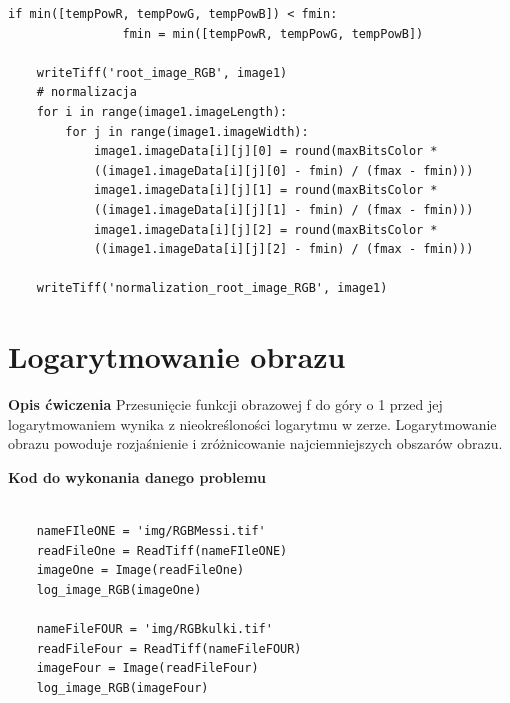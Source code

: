 \documentclass[magisterska,openany]{pracadypl}
\begin{document}
\begin{lstlisting}[caption={Pierwiastkowanie obrazu}]
            if min([tempPowR, tempPowG, tempPowB]) < fmin:
                fmin = min([tempPowR, tempPowG, tempPowB])

    writeTiff('root_image_RGB', image1)
    # normalizacja
    for i in range(image1.imageLength):
        for j in range(image1.imageWidth):
            image1.imageData[i][j][0] = round(maxBitsColor * 
            ((image1.imageData[i][j][0] - fmin) / (fmax - fmin)))
            image1.imageData[i][j][1] = round(maxBitsColor * 
            ((image1.imageData[i][j][1] - fmin) / (fmax - fmin)))
            image1.imageData[i][j][2] = round(maxBitsColor * 
            ((image1.imageData[i][j][2] - fmin) / (fmax - fmin)))

    writeTiff('normalization_root_image_RGB', image1)

\end{lstlisting}
\newpage


\section{Logarytmowanie obrazu}

\vspace{0.5cm}\textbf{\Large Opis ćwiczenia}
\vspace{0.25cm}\newline
Przesunięcie funkcji obrazowej f do góry o 1 przed jej logarytmowaniem wynika z
nieokreśloności logarytmu w zerze. Logarytmowanie obrazu powoduje rozjaśnienie i zróżnicowanie najciemniejszych obszarów obrazu.
\newline
\newline

\vspace{0.5cm}
\textbf{\Large Kod do wykonania danego problemu}
\lstset{language=Python}
\vspace{0.25cm}
\begin{lstlisting}

	nameFIleONE = 'img/RGBMessi.tif'
	readFileOne = ReadTiff(nameFIleONE)
	imageOne = Image(readFileOne)
	log_image_RGB(imageOne)
	
	nameFileFOUR = 'img/RGBkulki.tif'
	readFileFour = ReadTiff(nameFileFOUR)
	imageFour = Image(readFileFour)
	log_image_RGB(imageFour)

\end{lstlisting}
\newpage
\end{document}
